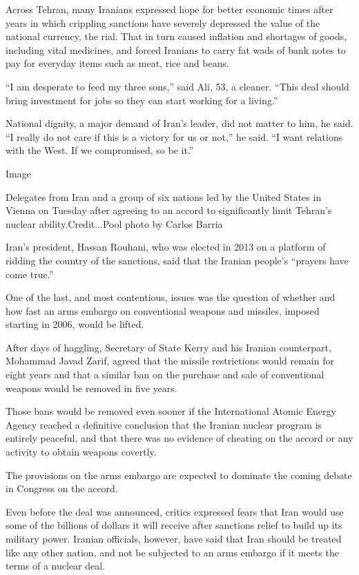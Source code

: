 Across Tehran, many Iranians expressed hope for better economic times
after years in which crippling sanctions have severely depressed the
value of the national currency, the rial. That in turn caused inflation
and shortages of goods, including vital medicines, and forced Iranians
to carry fat wads of bank notes to pay for everyday items such as meat,
rice and beans.

``I am desperate to feed my three sons,'' said Ali, 53, a cleaner.
``This deal should bring investment for jobs so they can start working
for a living.''

National dignity, a major demand of Iran's leader, did not matter to
him, he said. ``I really do not care if this is a victory for us or
not,'' he said. ``I want relations with the West. If we compromised, so
be it.''

Image

Delegates from Iran and a group of six nations led by the United States
in Vienna on Tuesday after agreeing to an accord to significantly limit
Tehran's nuclear ability.Credit...Pool photo by Carlos Barria

Iran's president, Hassan Rouhani, who was elected in 2013 on a platform
of ridding the country of the sanctions, said that the Iranian people's
``prayers have come true.''

One of the last, and most contentious, issues was the question of
whether and how fast an arms embargo on conventional weapons and
missiles, imposed starting in 2006, would be lifted.

After days of haggling, Secretary of State Kerry and his Iranian
counterpart, Mohammad Javad Zarif, agreed that the missile restrictions
would remain for eight years and that a similar ban on the purchase and
sale of conventional weapons would be removed in five years.

Those bans would be removed even sooner if the International Atomic
Energy Agency reached a definitive conclusion that the Iranian nuclear
program is entirely peaceful, and that there was no evidence of cheating
on the accord or any activity to obtain weapons covertly.

The provisions on the arms embargo are expected to dominate the coming
debate in Congress on the accord.

Even before the deal was announced, critics expressed fears that Iran
would use some of the billions of dollars it will receive after
sanctions relief to build up its military power. Iranian officials,
however, have said that Iran should be treated like any other nation,
and not be subjected to an arms embargo if it meets the terms of a
nuclear deal.

